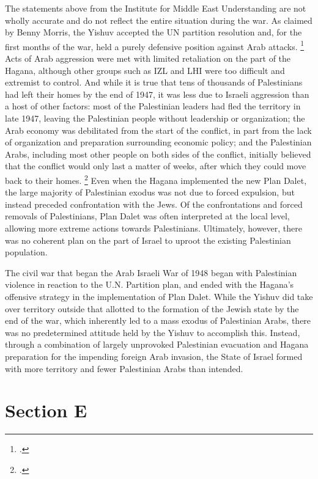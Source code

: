 \documentclass{turabian-researchpaper}
\begin{document}
The statements above from the Institute for Middle East Understanding are not wholly accurate and do not reflect the entire situation during the war.  As claimed by Benny Morris, the Yishuv accepted the UN partition resolution and, for the first months of the war, held a purely defensive position against Arab attacks.
\footcite[][98-100]{morris}
Acts of Arab aggression were met with limited retaliation on the part of the Hagana, although other groups such as IZL and LHI were too difficult and extremist to control.  And while it is true that tens of thousands of Palestinians had left their homes by the end of 1947, it was less due to Israeli aggression than a host of other factors: most of the Palestinian leaders had fled the territory in late 1947, leaving the Palestinian people without leadership or organization; the Arab economy was debilitated from the start of the conflict, in part from the lack of organization and preparation surrounding economic policy; and the Palestinian Arabs, including most other people on both sides of the conflict, initially believed that the conflict would only last a matter of weeks, after which they could move back to their homes.
\footcite[][84-85]{pappe}
Even when the Hagana implemented the new Plan Dalet, the large majority of Palestinian exodus was not due to forced expulsion, but instead preceded confrontation with the Jews.  Of the confrontations and forced removals of Palestinians, Plan Dalet was often interpreted at the local level, allowing more extreme actions towards Palestinians.  Ultimately, however, there was no coherent plan on the part of Israel to uproot the existing Palestinian population.

The civil war that began the Arab Israeli War of 1948 began with Palestinian violence in reaction to the U.N. Partition plan, and ended with the Hagana's offensive strategy in the implementation of Plan Dalet.  While the Yishuv did take over territory outside that allotted to the formation of the Jewish state by the end of the war, which inherently led to a mass exodus of Palestinian Arabs, there was no predetermined attitude held by the Yishuv to accomplish this.  Instead, through a combination of largely unprovoked Palestinian evacuation and Hagana preparation for the impending foreign Arab invasion, the State of Israel formed with more territory and fewer Palestinian Arabs than intended.

\section{Section E}


\printbibliography{}
\end{document}
